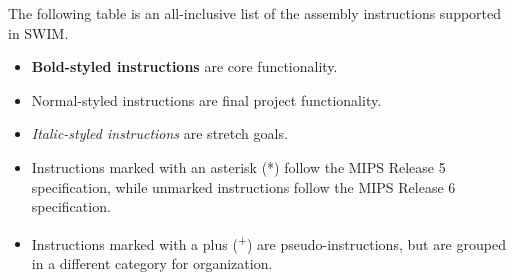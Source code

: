 \documentclass[
    paper=letter,
    parskip=half,
    fontsize=12pt,
    titlepage=firstiscover,
    toc=bibliography,
    numbers=endperiod
]{scrartcl}
\providecommand{\tightlist}{%
  \setlength{\itemsep}{0pt}\setlength{\parskip}{0pt}}
\begin{document}
The following table is an all-inclusive list of the assembly
instructions supported in SWIM.

\begin{itemize}
    \tightlist
    \item \textbf{Bold-styled instructions} are core functionality.
    \item Normal-styled instructions are final project functionality.
    \item \emph{Italic-styled instructions} are stretch goals.
    \item Instructions marked with an asterisk (*) follow the MIPS Release 5
          specification, while unmarked instructions follow the MIPS Release 6
          specification.
    \item Instructions marked with a plus (\textsuperscript{+}) are
          pseudo-instructions, but are grouped in a different category for
          organization.
\end{itemize}
\end{document}
